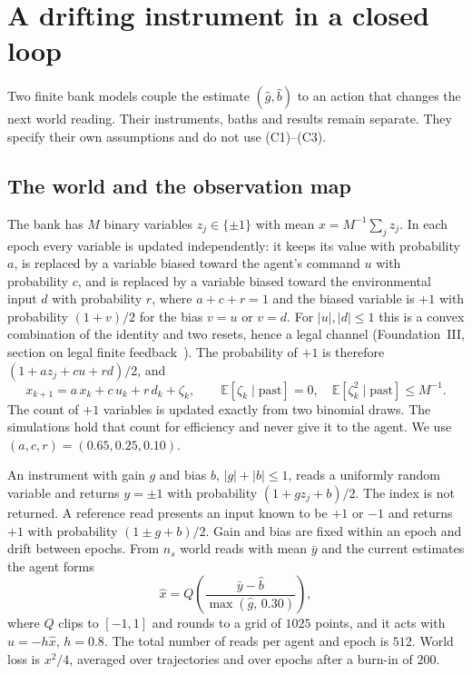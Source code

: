 \documentclass[12pt]{article}
\theoremstyle{definition}
\begin{document}
\section{A drifting instrument in a closed loop}\label{sec:loop_world}

Two finite bank models couple the estimate $(\hat g,\hat b)$ to an action that changes the next world reading. Their instruments, baths and results remain separate. They specify their own assumptions and do not use (C1)--(C3).

\subsection{The world and the observation map}\label{subsec:bank}

The bank has $M$ binary variables $z_j\in\{\pm1\}$ with mean $x=M^{-1}\sum_jz_j$. In each epoch every variable is updated independently: it keeps its value with probability $a$, is replaced by a variable biased toward the agent's command $u$ with probability $c$, and is replaced by a variable biased toward the environmental input $d$ with probability $r$, where $a+c+r=1$ and the biased variable is $+1$ with probability $(1+v)/2$ for the bias $v=u$ or $v=d$. For $|u|,|d|\le1$ this is a convex combination of the identity and two resets, hence a legal channel (Foundation~III, section on legal finite feedback~\cite{Liu2026FIII}). The probability of $+1$ is therefore $(1+az_j+cu+rd)/2$, and
\begin{equation}\label{eq:bank_step}
x_{k+1}=a\,x_k+c\,u_k+r\,d_k+\zeta_k,\qquad \mathbb E[\zeta_k\mid\text{past}]=0,\quad \mathbb E[\zeta_k^2\mid\text{past}]\le M^{-1}.
\end{equation}
The count of $+1$ variables is updated exactly from two binomial draws. The simulations hold that count for efficiency and never give it to the agent. We use $(a,c,r)=(0.65,0.25,0.10)$.

An instrument with gain $g$ and bias $b$, $|g|+|b|\le1$, reads a uniformly random variable and returns $y=\pm1$ with probability $(1+gz_j+b)/2$. The index is not returned. A reference read presents an input known to be $+1$ or $-1$ and returns $+1$ with probability $(1\pm g+b)/2$. Gain and bias are fixed within an epoch and drift between epochs. From $n_s$ world reads with mean $\bar y$ and the current estimates the agent forms
\begin{equation}\label{eq:xhat_loop}
\hat x=Q\!\left(\frac{\bar y-\hat b}{\max(\hat g,\,0.30)}\right),
\end{equation}
where $Q$ clips to $[-1,1]$ and rounds to a grid of $1025$ points, and it acts with $u=-h\hat x$, $h=0.8$. The total number of reads per agent and epoch is $512$. World loss is $x^2/4$, averaged over trajectories and over epochs after a burn-in of $200$.
\end{document}
